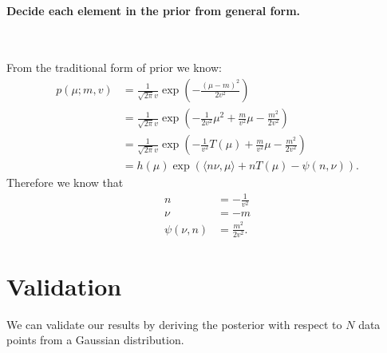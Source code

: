 \documentclass[letterpaper, 12pt]{article}
\begin{document}
\paragraph{Decide each element in the prior from general form.}~

From the traditional form of prior we know:
\begin{align*}
    p(\mu;m,v)&=\frac{1}{\sqrt{2\pi}v}\exp\left( -\frac{(\mu-m)^2}{2v^2} \right)\\
    &=\frac{1}{\sqrt{2\pi}v}\exp\left( -\frac{1}{2v^2}\mu^2+\frac{m}{v^2}\mu-\frac{m^2}{2v^2} \right)\\
    &=\frac{1}{\sqrt{2\pi}v}\exp\left( -\frac{1}{v^2}T(\mu)+\frac{m}{v^2}\mu-\frac{m^2}{2v^2} \right)\\
    &=h(\mu)\exp\left( \langle n\nu,\mu\rangle+nT(\mu)-\psi(n,\nu) \right).
\end{align*}
Therefore we know that 
\begin{align*}
    n&=-\frac{1}{v^2}\\
    \nu&=-m\\
    \psi(\nu,n)&=\frac{m^2}{2v^2}.
\end{align*}

\section*{Validation}
We can validate our results by deriving the posterior with respect to $N$ data points from a Gaussian distribution.
\end{document}
